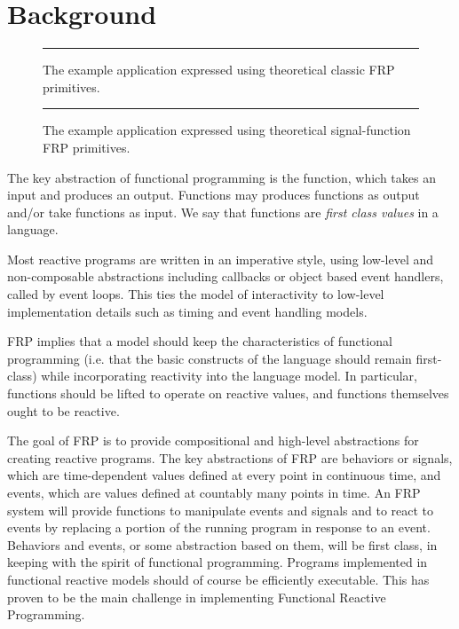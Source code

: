 \section{Background}
\label{section:Background}


\begin{figure}

\hrule

\caption{The example application expressed using theoretical classic FRP primitives.}
\label{figure:classic-frp-example}
\end{figure}



\begin{figure}

\hrule

\caption{The example application expressed using theoretical signal-function FRP primitives.}
\label{figure:sf-frp-example}
\end{figure}

The key abstraction of functional programming is the function, which takes an input and produces an output. Functions may produces functions
as output and/or take functions as input. We say that functions are {\em first class values} in a language.

Most reactive programs are written in an imperative style, using low-level and non-composable abstractions including callbacks
or object based event handlers, called by event loops. This ties the model of interactivity to low-level implementation details such as timing and event handling models. 

FRP implies that a model should keep the characteristics of functional programming (i.e. that the basic constructs of the language
should remain first-class) while incorporating reactivity into the language model. In particular, functions should be lifted to operate on reactive values,
and functions themselves ought to be reactive.

The goal of FRP is to provide compositional and high-level abstractions for creating reactive programs. The key
abstractions of FRP are behaviors or signals, which are time-dependent values defined at every point in continuous time, and events, which are 
values defined at countably many points in time. An FRP system will provide functions to manipulate events and signals and to react
to events by replacing a portion of the running program in response to an event. Behaviors and events, or some abstraction
based on them, will be first class, in keeping with the spirit of functional programming. Programs implemented in functional reactive
models should of course be efficiently executable. This has proven to be the main challenge in implementing Functional Reactive Programming.


